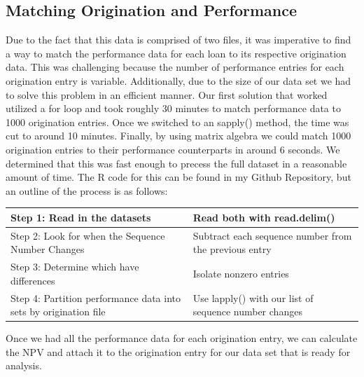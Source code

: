 \documentclass[12 pt]{uncw_thesis}
\theoremstyle{plain}
\theoremstyle{remark}
\theoremstyle{definition}
\begin{document}
\subsection{Matching Origination and Performance}
Due to the fact that this data is comprised of two files, it was imperative to find a way to match the performance data for each loan to its respective origination data. This was challenging because the number of performance entries for each origination entry is variable. Additionally, due to the size of our data set we had to solve this problem in an efficient manner. Our first solution that worked utilized a for loop and took roughly 30 minutes to match performance data to 1000 origination entries. Once we switched to an sapply() method, the time was cut to around 10 minutes. Finally, by using matrix algebra we could match 1000 origination entries to their performance counterparts in around 6 seconds. We determined that this was fast enough to precess the full dataset in a reasonable amount of time. The R code for this can be found in my Github Repository, but an outline of the process is as follows:
\begin{center}
	\begin{tabular}{|M{6cm}|M{8cm}|} 
		\hline
		Step 1: Read in the datasets & Read both with read.delim()\\ 
		\hline
		Step 2: Look for when the Sequence Number Changes& Subtract each sequence number from the previous entry\\
		\hline
		Step 3: Determine which have differences & Isolate nonzero entries \\
		\hline
		Step 4: Partition performance data into sets by origination file & Use lapply() with our list of sequence number changes\\
		\hline
	\end{tabular}
\end{center}
Once we had all the performance data for each origination entry, we can calculate the NPV and attach it to the origination entry for our data set that is ready for analysis.
\end{document}
